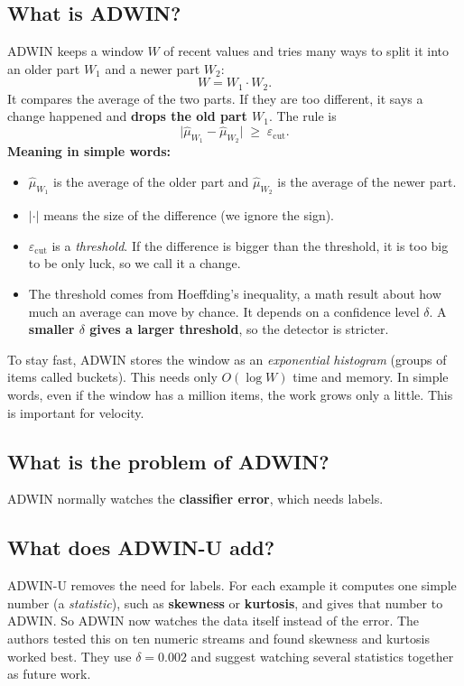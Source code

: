 \documentclass[11pt,a4paper]{article}
\begin{document}
\subsection{What is ADWIN?}
ADWIN keeps a window $W$ of recent values and tries many ways to split it into an older part $W_1$ and a newer part $W_2$:
\[
W = W_1 \cdot W_2 .
\]
It compares the average of the two parts. If they are too different, it says a change happened and \textbf{drops the old part $W_1$}. The rule is
\[
\bigl|\hat\mu_{W_1}-\hat\mu_{W_2}\bigr| \;\ge\; \varepsilon_{\mathrm{cut}} .
\]
\textbf{Meaning in simple words:}
\begin{itemize}
  \item $\hat\mu_{W_1}$ is the average of the older part and $\hat\mu_{W_2}$ is the average of the newer part.
  \item $|\cdot|$ means the size of the difference (we ignore the sign).
  \item $\varepsilon_{\mathrm{cut}}$ is a \emph{threshold}. If the difference is bigger than the threshold, it is too big to be only luck, so we call it a change.
  \item The threshold comes from Hoeffding's inequality, a math result about how much an average can move by chance. It depends on a confidence level $\delta$. A \textbf{smaller $\delta$ gives a larger threshold}, so the detector is stricter.
\end{itemize}

To stay fast, ADWIN stores the window as an \emph{exponential histogram} (groups of items called buckets). This needs only $O(\log W)$ time and memory. In simple words, even if the window has a million items, the work grows only a little. This is important for velocity.

\subsection{What is the problem of ADWIN?}
ADWIN normally watches the \textbf{classifier error}, which needs labels.

\subsection{What does ADWIN-U add?}
ADWIN-U removes the need for labels. For each example it computes one simple number (a \emph{statistic}), such as \textbf{skewness} or \textbf{kurtosis}, and gives that number to ADWIN. So ADWIN now watches the data itself instead of the error. The authors tested this on ten numeric streams and found skewness and kurtosis worked best. They use $\delta = 0.002$ and suggest watching several statistics together as future work.
\end{document}
